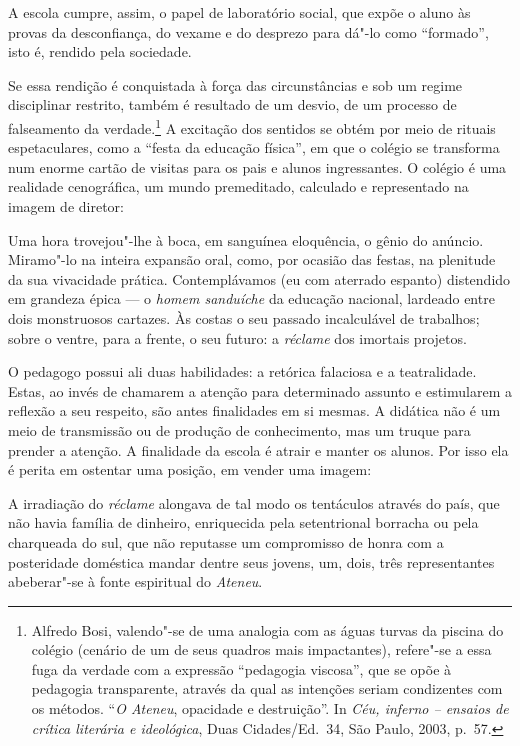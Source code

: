 A escola cumpre, assim, o papel de laboratório social, que expõe o aluno
às provas da desconfiança, do vexame e do desprezo para dá"-lo como
``formado'', isto é, rendido pela sociedade.

Se essa rendição é conquistada à força das
circunstâncias e sob um regime disciplinar restrito, também é resultado
de um desvio, de um processo de falseamento da verdade.\footnote{Alfredo Bosi, 
valendo"-se de uma analogia com as águas turvas da
piscina do colégio (cenário de um de seus quadros mais impactantes),
refere"-se a essa fuga da verdade com a expressão ``pedagogia viscosa'',
que se opõe à pedagogia transparente, através da qual as intenções
seriam condizentes com os métodos. ``\textit{O Ateneu}, opacidade e
destruição''. In \textit{Céu, inferno -- ensaios de crítica literária e
ideológica}, Duas Cidades/Ed.~34, São Paulo, 2003, p.~57.} 
A excitação dos sentidos se obtém por meio de
rituais espetaculares, como a ``festa da educação física'', em que o
colégio se transforma num enorme cartão de visitas para os pais e
alunos ingressantes. O colégio é uma realidade cenográfica, um mundo
premeditado, calculado e representado na imagem de diretor:

\begin{hedraquote}
Uma hora trovejou"-lhe à boca, em sanguínea eloquência,
o gênio do anúncio. Miramo"-lo na inteira expansão oral, como, por
ocasião das festas, na plenitude da sua vivacidade prática.
Contemplávamos (eu com aterrado espanto) distendido em grandeza épica ---
o \textit{homem sanduíche} da educação
nacional, lardeado entre dois monstruosos cartazes. Às costas o seu
passado incalculável de trabalhos; sobre o ventre, para a frente, o seu
futuro: a \textit{réclame} dos imortais projetos.
\end{hedraquote}

O pedagogo possui ali duas habilidades: a retórica falaciosa e a
teatralidade. Estas, ao invés de chamarem a atenção para determinado
assunto e estimularem a reflexão a seu respeito, são antes finalidades
em si mesmas. A didática não é um meio de transmissão ou de produção de
conhecimento, mas um truque para prender a atenção. A finalidade da
escola é atrair e manter os alunos. Por isso ela é perita em ostentar
uma posição, em vender uma imagem:

\begin{hedraquote}
A irradiação do
\textit{réclame} alongava de tal modo os
tentáculos através do país, que não havia família de dinheiro,
enriquecida pela setentrional borracha ou pela charqueada do sul, que
não reputasse um compromisso de honra com a posteridade doméstica
mandar dentre seus jovens, um, dois, três representantes abeberar"-se à
fonte espiritual do \textit{Ateneu}.
\end{hedraquote}

